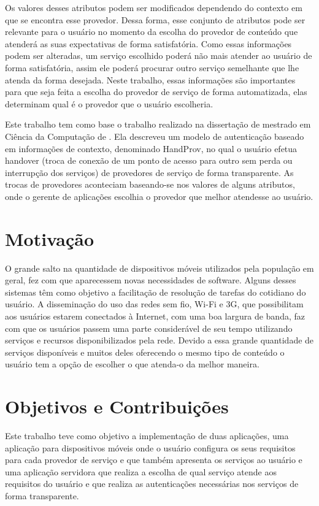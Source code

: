 Os valores desses atributos podem ser modificados dependendo do contexto em que se encontra esse provedor. Dessa forma, esse conjunto de atributos pode ser relevante para o usuário no momento da escolha do provedor de conteúdo que atenderá as suas expectativas de forma satisfatória. Como essas informações podem ser alteradas, um serviço escolhido poderá não mais atender ao usuário de forma satisfatória, assim ele poderá procurar outro serviço semelhante que lhe atenda da forma desejada. Neste trabalho, essas informações são importantes para que seja feita a escolha do provedor de serviço de forma automatizada, elas determinam qual é o provedor que o usuário escolheria.

Este trabalho tem como base o trabalho realizado na dissertação de mestrado em Ciência da Computação de \cite{praca12}. Ela descreveu um modelo de autenticação baseado em informações de contexto, denominado HandProv, no qual o usuário efetua handover (troca de conexão de um ponto de acesso para outro sem perda ou interrupção dos serviços) de provedores de serviço de forma transparente. As trocas de provedores aconteciam baseando-se nos valores de alguns atributos, onde o gerente de aplicações escolhia o provedor que melhor atendesse ao usuário. 

\section{Motivação}
O grande salto na quantidade de dispositivos móveis utilizados pela população em geral, fez com que aparecessem novas necessidades de software. Alguns desses sistemas têm como objetivo a facilitação de resolução de tarefas do cotidiano do usuário.
A disseminação do uso das redes sem fio, Wi-Fi e 3G, que possibilitam aos usuários estarem conectados à Internet, com uma boa largura de banda, faz com que os usuários passem uma parte considerável de seu tempo utilizando serviços e recursos disponibilizados pela rede.
Devido a essa grande quantidade de serviços disponíveis e muitos deles oferecendo o mesmo tipo de conteúdo o usuário tem a opção de escolher o que atenda-o da melhor maneira.

\section{Objetivos e Contribuições}
Este trabalho teve como objetivo a implementação de duas aplicações, uma aplicação para dispositivos móveis onde o usuário configura os seus requisitos para cada provedor de serviço e que também apresenta os serviços ao usuário e uma aplicação servidora que realiza a escolha de qual serviço atende aos requisitos do usuário e que realiza as autenticações necessárias nos serviços de forma transparente.

